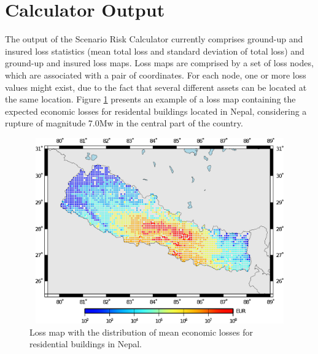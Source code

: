 \section{Calculator Output}
The output of the Scenario Risk Calculator currently comprises ground-up and insured loss statistics (mean total loss and standard deviation of total loss) and ground-up and insured loss maps. Loss maps are comprised by a set of loss nodes, which are associated with a pair of coordinates. For each node, one or more loss values might exist, due to the fact that several different \glspl{asset} can be located at the same location.  Figure \ref{fig:detlosses} presents an example of a loss map containing the expected economic losses for residental buildings located in Nepal, considering a rupture of magnitude 7.0Mw in the central part of the country.

\begin{figure}[ht]
\centering
\includegraphics[width=12cm,height=8cm]{./figures/risk/LossmapDet.eps}
\caption{Loss map with the distribution of mean economic losses for residential buildings in Nepal.}
\label{fig:detlosses}
\end{figure} 